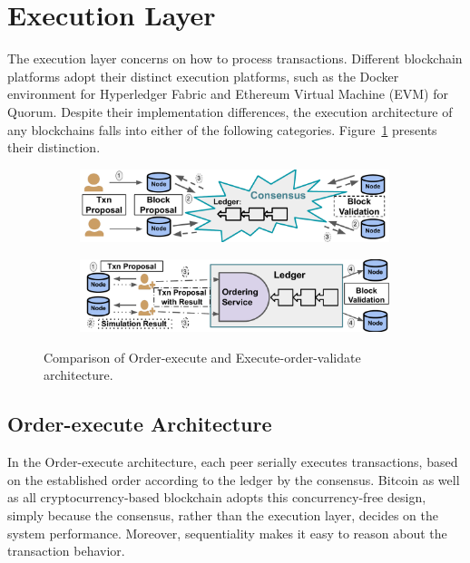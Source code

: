 \section{Execution Layer}
The execution layer concerns on how to process transactions. 
Different blockchain platforms adopt their distinct execution platforms, such as the Docker environment for Hyperledger Fabric and Ethereum Virtual Machine (EVM) for Quorum. 
Despite their implementation differences, the execution architecture of any blockchains falls into either of the following categories. Figure~\ref{diagram:literature:execution} presents their distinction. 

\begin{figure}
    \centering
    \begin{subfigure}{0.95\textwidth}
      \includegraphics[width=0.99\textwidth]{diagram/literature/ox_arch.pdf}
    \end{subfigure}
    \begin{subfigure}{0.95\textwidth}
      \includegraphics[width=0.99\textwidth]{diagram/literature/eov_arch.pdf}
    \end{subfigure}
    \caption{Comparison of  Order-execute and Execute-order-validate architecture. }
    \label{diagram:literature:execution}
\end{figure}

\subsection{Order-execute Architecture}
In the Order-execute architecture, each peer serially executes transactions, based on the established order according to the ledger by the consensus. 
Bitcoin as well as all cryptocurrency-based blockchain adopts this concurrency-free design, simply because the consensus, rather than the execution layer, decides on the system performance. 
Moreover, sequentiality makes it easy to reason about the transaction behavior. 


